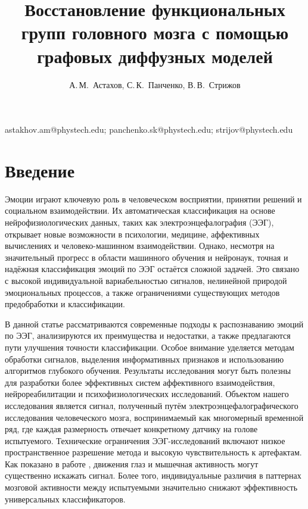 \documentclass[12pt, twoside]{article}
\begin{document}
\title
    {Восстановление функциональных групп головного мозга с помощью графовых диффузных моделей}
\author
    {А.\,М.~Астахов, С.\,К.~Панченко, В.\,В.~Стрижов} 
\email
    {astakhov.am@phystech.edu; panchenko.sk@phystech.edu; strijov@phystech.edu}

\maketitle
\par

\section{Введение}

Эмоции играют ключевую роль в человеческом восприятии, принятии решений и социальном взаимодействии. Их автоматическая классификация на основе нейрофизиологических данных, таких как электроэнцефалография (ЭЭГ), открывает новые возможности в психологии, медицине, аффективных вычислениях и человеко-машинном взаимодействии. Однако, несмотря на значительный прогресс в области машинного обучения и нейронаук, точная и надёжная классификация эмоций по ЭЭГ остаётся сложной задачей. Это связано с высокой индивидуальной вариабельностью сигналов, нелинейной природой эмоциональных процессов, а также ограничениями существующих методов предобработки и классификации.

В данной статье рассматриваются современные подходы к распознаванию эмоций по ЭЭГ, анализируются их преимущества и недостатки, а также предлагаются пути улучшения точности классификации. Особое внимание уделяется методам обработки сигналов, выделения информативных признаков и использованию алгоритмов глубокого обучения. Результаты исследования могут быть полезны для разработки более эффективных систем аффективного взаимодействия, нейрореабилитации и психофизиологических исследований. Объектом нашего исследования является сигнал, полученный путём электроэнцефалографического исследования человеческого мозга, воспринимаемый как многомерный временной ряд, где каждая размерность отвечает конкретному датчику на голове испытуемого. Технические ограничения ЭЭГ-исследований включают низкое пространственное разрешение метода и высокую чувствительность к артефактам. Как показано в работе \cite{1}, движения глаз и мышечная активность могут существенно искажать сигнал. Более того, индивидуальные различия в паттернах мозговой активности между испытуемыми значительно снижают эффективность универсальных классификаторов.
\end{document}
